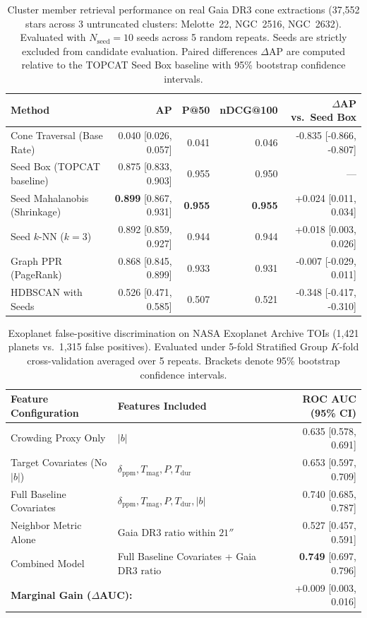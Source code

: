 \begin{table}[htbp]
\centering
\caption{Cluster member retrieval performance on real Gaia DR3 cone extractions (37{,}552 stars across 3 untruncated clusters: Melotte~22, NGC~2516, NGC~2632). Evaluated with $N_{\mathrm{seed}}=10$ seeds across 5 random repeats. Seeds are strictly excluded from candidate evaluation. Paired differences $\Delta\text{AP}$ are computed relative to the TOPCAT Seed Box baseline with 95\% bootstrap confidence intervals.}
\label{tab:cluster_retrieval}
\begin{tabular}{lrrrr}
\toprule
\textbf{Method} & \textbf{AP} & \textbf{P@50} & \textbf{nDCG@100} & \textbf{$\Delta$AP vs.\ Seed Box} \\
\midrule
Cone Traversal (Base Rate)   & 0.040 [0.026, 0.057] & 0.041 & 0.046 & -0.835 [-0.866, -0.807] \\
Seed Box (TOPCAT baseline)   & 0.875 [0.833, 0.903] & 0.955 & 0.950 & --- \\
Seed Mahalanobis (Shrinkage) & \textbf{0.899} [0.867, 0.931] & \textbf{0.955} & \textbf{0.955} & +0.024 [0.011, 0.034] \\
Seed $k$-NN ($k=3$)          & 0.892 [0.859, 0.927] & 0.944 & 0.944 & +0.018 [0.003, 0.026] \\
Graph PPR (PageRank)         & 0.868 [0.845, 0.899] & 0.933 & 0.931 & -0.007 [-0.029, 0.011] \\
HDBSCAN with Seeds           & 0.526 [0.471, 0.585] & 0.507 & 0.521 & -0.348 [-0.417, -0.310] \\
\bottomrule
\end{tabular}
\end{table}

\begin{table}[htbp]
\centering
\caption{Exoplanet false-positive discrimination on NASA Exoplanet Archive TOIs (1{,}421 planets vs.\ 1{,}315 false positives). Evaluated under 5-fold Stratified Group $K$-fold cross-validation averaged over 5 repeats. Brackets denote 95\% bootstrap confidence intervals.}
\label{tab:toi_vetting}
\begin{tabular}{llr}
\toprule
\textbf{Feature Configuration} & \textbf{Features Included} & \textbf{ROC AUC (95\% CI)} \\
\midrule
Crowding Proxy Only           & $|b|$                                                     & 0.635 [0.578, 0.691] \\
Target Covariates (No $|b|$)  & $\delta_{\mathrm{ppm}}, T_{\mathrm{mag}}, P, T_{\mathrm{dur}}$             & 0.653 [0.597, 0.709] \\
Full Baseline Covariates       & $\delta_{\mathrm{ppm}}, T_{\mathrm{mag}}, P, T_{\mathrm{dur}}, |b|$       & 0.740 [0.685, 0.787] \\
Neighbor Metric Alone         & Gaia DR3 $\text{ratio}$ within $21''$                      & 0.527 [0.457, 0.591] \\
Combined Model                & Full Baseline Covariates + Gaia DR3 $\text{ratio}$        & \textbf{0.749} [0.697, 0.796] \\
\midrule
\multicolumn{2}{l}{\textbf{Marginal Gain ($\Delta$AUC):}} & +0.009 [0.003, 0.016] \\
\bottomrule
\end{tabular}
\end{table}
